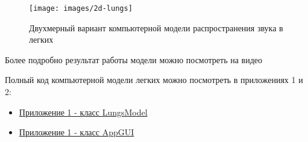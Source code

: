\documentclass[../main.tex]{subfiles}
\begin{document}
\begin{figure}[H]
\centering
\texttt{[image: images/2d-lungs]}
\caption{Двухмерный вариант компьютерной модели распространения звука в легких}
\end{figure}

Более подробно результат работы модели можно посмотреть на видео \cite{lungs-2d-youtube}

Полный код компьютерной модели легких можно посмотреть в приложениях 1 и 2:
\begin{itemize}
    \item \hyperref[appendix1]{Приложение 1 -  класс LungsModel}
    \item \hyperref[appendix2]{Приложение 1 -  класс AppGUI}
\end{itemize}
 

\newpage
\end{document}
